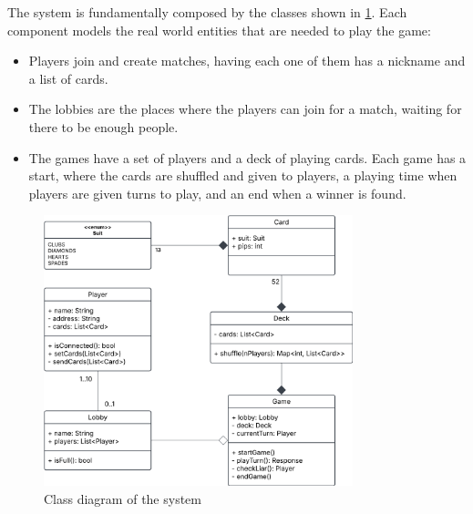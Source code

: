 \documentclass{scrartcl}
\begin{document}
The system is fundamentally composed by the classes shown in \cref{fig:classes}. \newline
Each component models the real world entities that are needed to play the game:
\begin{itemize}
  \item Players join and create matches, having each one of them has a nickname and a list of cards.
  \item The lobbies are the places where the players can join for a match, 
  waiting for there to be enough people.
  \item The games have a set of players and a deck of playing cards. 
  Each game has a start, where the cards are shuffled and given to players, 
  a playing time when players are given turns to play, and an end when a winner is found.
\end{itemize}
\begin{figure}
  \centering
  \includegraphics[width=0.8\textwidth]{figures/classes.png}
  \caption{Class diagram of the system} 
  \label{fig:classes}
\end{figure}
\end{document}
